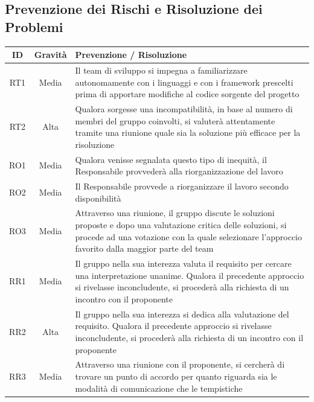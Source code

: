 \documentclass[a4paper, 12pt]{article}
\begin{document}
\subsection{Prevenzione dei Rischi e Risoluzione dei Problemi}
\begin{center}
	\begin{tabularx}{\textwidth}{||c|c||X||}
		\hline
		\textbf{ID} & \textbf{Gravità} & \textbf{Prevenzione / Risoluzione}                                                                                                                                                                                      \\
		\hline \hline
		RT1         & Media            & Il team di sviluppo si impegna a familiarizzare autonomamente con i linguaggi e con i framework prescelti prima di apportare modifiche al codice sorgente del progetto                                                  \\
		\hline
		RT2         & Alta             & Qualora sorgesse una incompatibilità, in base al numero di membri del gruppo coinvolti, si valuterà attentamente tramite una riunione quale sia la soluzione più efficace per la risoluzione                            \\
		\hline
		RO1         & Media            & Qualora venisse segnalata questo tipo di inequità, il Responsabile provvederà alla riorganizzazione del lavoro                                                                                                          \\
		\hline
		RO2         & Media            & Il Responsabile provvede a riorganizzare il lavoro secondo disponibilità                                                                                                                                                \\
		\hline
		RO3         & Media            & Attraverso una riunione, il gruppo discute le soluzioni proposte e dopo una valutazione critica delle soluzioni, si procede ad una votazione con la quale selezionare l'approccio favorito dalla maggior parte del team \\
		\hline
		RR1         & Media            & Il gruppo nella sua interezza valuta il requisito per cercare una interpretazione unanime. Qualora il precedente approccio si rivelasse inconcludente, si procederà alla richiesta di un incontro con il proponente     \\
		\hline
		RR2         & Alta             & Il gruppo nella sua interezza si dedica alla valutazione del requisito. Qualora il precedente approccio si rivelasse inconcludente, si procederà alla richiesta di un incontro con il proponente                        \\
		\hline
		RR3         & Media            & Attraverso una riunione con il proponente, si cercherà di trovare un punto di accordo per quanto riguarda sia le modalità di comunicazione che le tempistiche                                                           \\
		\hline \hline
	\end{tabularx}
\end{center}
\end{document}
